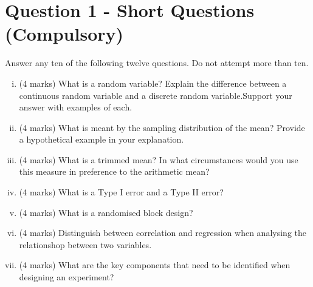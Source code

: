 \documentclass[a4paper,12pt]{article}
\begin{document}
\section*{Question 1 - Short Questions (Compulsory)}


Answer any ten of the following twelve questions. Do not attempt more than ten.
\begin{enumerate}[(i)]
	
		\item (4 marks) What is a random variable? Explain the difference between a continuous random variable and a discrete random variable.Support your answer with examples of each.
		
	\item (4 marks) What is meant by the sampling distribution of the mean? Provide a hypothetical example in your explanation.
	
	\item (4 marks) What is a trimmed mean? In what circumstances would you use this measure in preference to the arithmetic mean?
	
	\item (4 marks) What is a Type I error and a Type II error?

	

	
	\item (4 marks) What is a randomised block design?
	
	\item (4 marks) Distinguish between correlation and regression when analysing the relationshop between two variables.
	

	
	\item (4 marks) What are the key components that need to be identified when designing an
	experiment?
	
	

\end{enumerate}
\end{document}
